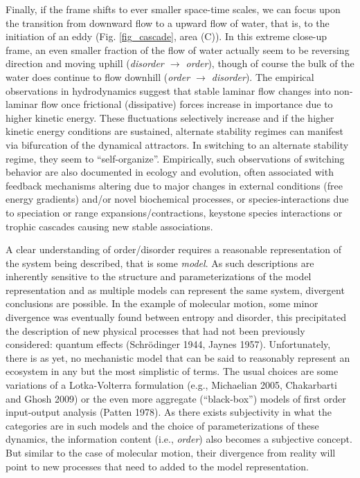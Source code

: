 \documentclass[11pt,letterpaper,]{paper}
\begin{document}
Finally, if the frame shifts to ever smaller space-time scales, we can
focus upon the transition from downward flow to a upward flow of water,
that is, to the initiation of an eddy (Fig. \ref{fig_cascade}, area
(C)). In this extreme close-up frame, an even smaller fraction of the
flow of water actually seem to be reversing direction and moving uphill
(\emph{disorder \(\rightarrow\) order}), though of course the bulk of
the water does continue to flow downhill (\emph{order \(\rightarrow\)
disorder}). The empirical observations in hydrodynamics suggest that
stable laminar flow changes into non-laminar flow once frictional
(dissipative) forces increase in importance due to higher kinetic
energy. These fluctuations selectively increase and if the higher
kinetic energy conditions are sustained, alternate stability regimes can
manifest via bifurcation of the dynamical attractors. In switching to an
alternate stability regime, they seem to ``self-organize''. Empirically,
such observations of switching behavior are also documented in ecology
and evolution, often associated with feedback mechanisms altering due to
major changes in external conditions (free energy gradients) and/or
novel biochemical processes, or species-interactions due to speciation
or range expansions/contractions, keystone species interactions or
trophic cascades causing new stable associations.

A clear understanding of order/disorder requires a reasonable
representation of the system being described, that is some \emph{model}.
As such descriptions are inherently sensitive to the structure and
parameterizations of the model representation and as multiple models can
represent the same system, divergent conclusions are possible. In the
example of molecular motion, some minor divergence was eventually found
between entropy and disorder, this precipitated the description of new
physical processes that had not been previously considered: quantum
effects (Schrödinger 1944, Jaynes 1957). Unfortunately, there is as yet,
no mechanistic model that can be said to reasonably represent an
ecosystem in any but the most simplistic of terms. The usual choices are
some variations of a Lotka-Volterra formulation (e.g., Michaelian 2005,
Chakarbarti and Ghosh 2009) or the even more aggregate (``black-box'')
models of first order input-output analysis (Patten 1978). As there
exists subjectivity in what the categories are in such models and the
choice of parameterizations of these dynamics, the information content
(i.e., \emph{order}) also becomes a subjective concept. But similar to
the case of molecular motion, their divergence from reality will point
to new processes that need to added to the model representation.
\end{document}
